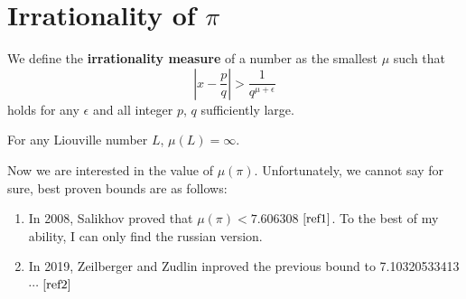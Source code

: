 \documentclass[UTF8, 12pt]{ctexart}
\begin{document}
    \section{Irrationality of $\pi$}
    We define the \textbf{irrationality measure} of a number as the smallest $\mu$ such that
    $$
    |x - \frac{p}{q}| > \frac{1}{q^{\mu + \epsilon}}
    $$
    holds for any $\epsilon$ and all integer $p$, $q$ sufficiently large. \par
    For any Liouville number $L$, $\mu(L) = \infty$. \par
    Now we are interested in the value of $\mu(\pi)$. Unfortunately, we cannot say for sure, best proven bounds are as follows:
    \begin{enumerate}
        \item In 2008, Salikhov proved that $\mu(\pi) < 7.606308$ \textcolor{blue}{$\cite{ref1}$}. To the best of my ability, I can only find the russian version.
        \item In 2019, Zeilberger and Zudlin inproved the previous bound to 7.10320533413$\cdots$ \textcolor{blue}{$\cite{ref2}$}
    \end{enumerate}
    
    \begin{thebibliography}{99}
    \end{thebibliography}
\end{document}
